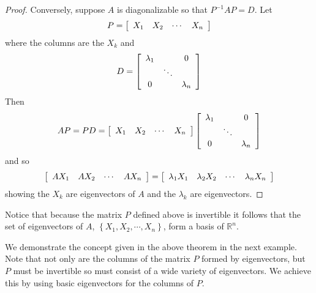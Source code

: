 \begin{proof}
Conversely, suppose $A$ is diagonalizable so that $P^{-1}AP=D.$ Let 
\begin{equation*}
P=\left[
\begin{array}{cccc}
X_{1} & X_{2} & \cdots & X_{n}
\end{array}
\right] 
\end{equation*}
 where the columns are the $X_{k}$ and
\begin{equation*}
D=\left[
\begin{array}{ccc}
\lambda _{1} &  & 0 \\
& \ddots &  \\
0 &  & \lambda _{n}
\end{array}
\right]
\end{equation*}
Then
\begin{equation*}
AP=PD=\left[
\begin{array}{cccc}
X_{1} & X_{2} & \cdots & X_{n}
\end{array}
\right] \left[
\begin{array}{ccc}
\lambda _{1} &  & 0 \\
& \ddots &  \\
0 &  & \lambda _{n}
\end{array}
\right]
\end{equation*}
and so
\begin{equation*}
\left[
\begin{array}{cccc}
AX_{1} & AX_{2} & \cdots & AX_{n}
\end{array}
\right] =\left[
\begin{array}{cccc}
\lambda _{1}X_{1} & \lambda _{2}X_{2} & \cdots & \lambda
_{n}X_{n}
\end{array}
\right]
\end{equation*}
showing the $X_{k}$ are eigenvectors of $A$ and the $\lambda _{k}$
are eigenvectors.
\end{proof}

Notice that because the matrix $P$ defined above is invertible it follows that the set of eigenvectors of $A$, $\left\{ X_1, X_2, \cdots, X_n \right\}$, form a basis of $\mathbb{R}^n$. 

We demonstrate the concept given in the above theorem in the next example. Note that not only
are the columns of the matrix $P$ formed by eigenvectors, but $P$ must
be invertible so must consist of a wide variety of eigenvectors. We
achieve this by using basic eigenvectors for the columns of $P$.

